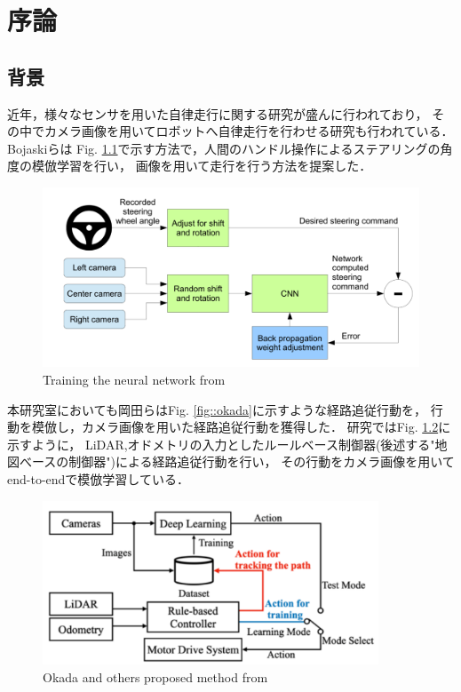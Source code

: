 \chapter{序論}
\section{背景}
近年，様々なセンサを用いた自律走行に関する研究が盛んに行われており，
その中でカメラ画像を用いてロボットへ自律走行を行わせる研究も行われている．
Bojaskiら\cite{Nvidia}は
Fig. \ref{fig::nvidia}で示す方法で，人間のハンドル操作によるステアリングの角度の模倣学習を行い，
画像を用いて走行を行う方法を提案した．

\begin{figure}[h]
    \centering
    \includegraphics[width = 13cm]{./figs/EndtoEnd_Learning_for_Self-Driving_Cars.pdf}
    \caption{Training the neural network from \cite{Nvidia}}
    \label{fig::nvidia}
\end{figure}

\newpage
本研究室においても岡田ら\cite{okada}はFig. \ref{fig::okada}に示すような経路追従行動を，
行動を模倣し，カメラ画像を用いた経路追従行動を獲得した．
研究ではFig. \ref{fig::okada_sys}に示すように，
LiDAR,オドメトリの入力としたルールベース制御器(後述する"地図べースの制御器")による経路追従行動を行い，
その行動をカメラ画像を用いてend-to-endで模倣学習している．
\begin{figure}[h]
    \centering
    \includegraphics[width = 10cm]{./figs/okada_sys.png}
    \caption{Okada and others proposed method from \cite{okada}}
    \label{fig::okada_sys}
\end{figure}

